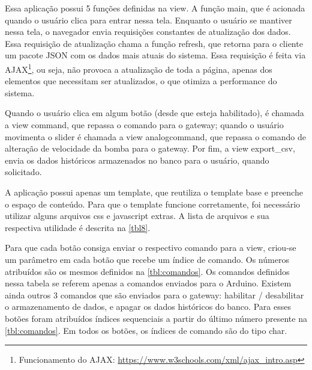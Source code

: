 	Essa aplicação possui 5 funções definidas na view. A função main, que é acionada quando o usuário clica para entrar nessa tela. Enquanto o usuário se mantiver nessa tela, o navegador envia requisições constantes de atualização dos dados. Essa requisição de atualização chama a função refresh, que retorna para o cliente um pacote JSON com os dados mais atuais do sistema. Essa requisição é feita via AJAX\footnote{Funcionamento do AJAX: \url{https://www.w3schools.com/xml/ajax_intro.asp}}, ou seja, não provoca a atualização de toda a página, apenas dos elementos que necessitam ser atualizados, o que otimiza a performance do sistema.
	
	Quando o usuário clica em algum botão (desde que esteja habilitado), é chamada a view command, que repassa o comando para o gateway; quando o usuário movimenta o slider é chamada a view analogcommand, que repassa o comando de alteração de velocidade da bomba para o gateway. Por fim, a view export\_csv, envia os dados históricos armazenados no banco para o usuário, quando solicitado.
	
	A aplicação possui apenas um template, que reutiliza o template base e preenche o espaço de conteúdo. Para que o template funcione corretamente, foi necessário utilizar alguns arquivos css e javascript extras. A lista de arquivos e sua respectiva utilidade é descrita na \autoref{tbl8}. 
	
	Para que cada botão consiga enviar o respectivo comando para a view, criou-se um parâmetro em cada botão que recebe um índice de comando. Os números atribuídos são os mesmos definidos na \autoref{tbl:comandos}. Os comandos definidos nessa tabela se referem apenas a comandos enviados para o Arduino. Existem ainda outros 3 comandos que são enviados para o gateway: habilitar / desabilitar o armazenamento de dados, e apagar os dados históricos do banco. Para esses botões foram atribuídos índices sequenciais a partir do último número presente na \autoref{tbl:comandos}. Em todos os botões, os índices de comando são do tipo char.
	
